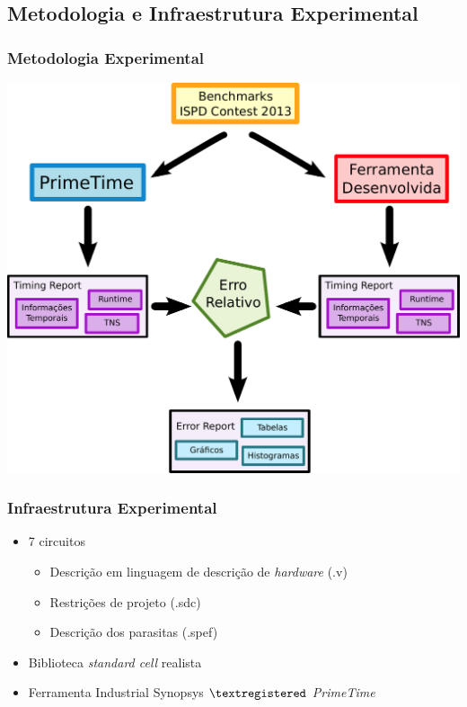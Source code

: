\documentclass[10pt,a4paper]{beamer}
\begin{document}
		\subsection*{Metodologia e Infraestrutura Experimental}
		\begin{frame}[t]
			\frametitle{Metodologia Experimental}
			\begin{center}
				\includegraphics[width=0.7\linewidth]{img/fluxo_validacao.pdf} 
			\end{center}
		\end{frame}	
		
		\begin{frame}[t]
			\frametitle{Infraestrutura Experimental}
			\begin{center}
				\begin{itemize}
					\item 7 circuitos \\
					\begin{itemize}
						\item Descrição em linguagem de descrição de \textit{hardware} (.v) \\
						\item Restrições de projeto (.sdc)\\
						\item Descrição dos parasitas (.spef)
					\end{itemize}
					\item Biblioteca \textit{standard cell} realista \\
					\item Ferramenta Industrial Synopsys $\textregistered$ \textit{PrimeTime}
				\end{itemize}
			\end{center}
		\end{frame}			
		
\end{document}
